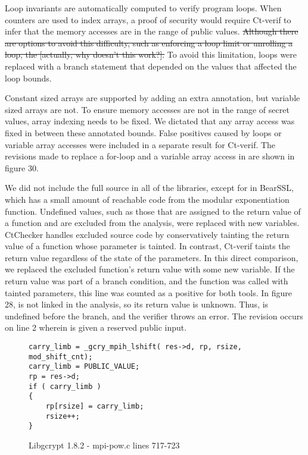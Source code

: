 Loop invariants are automatically computed to verify program loops.  When
counters are used to index arrays, a proof of security would require Ct-verif
to infer that the memory accesses are in the range of public values.  \sout{Although
there are options to avoid this difficulty, such as enforcing a loop limit or
unrolling a loop, the [actually, why doesn't this work?].}  To avoid this
limitation, loops were replaced with a branch statement that depended on the
values that affected the loop bounds.

Constant sized arrays are supported by adding an extra annotation, but variable
sized arrays are not. To ensure memory accesses are not in the range of secret
values, array indexing needs to be fixed.  We dictated that any array access
was fixed in between these annotated bounds.  False positives caused by loops
or variable array accesses were included in a separate result for Ct-verif. The
revisions made to replace a for-loop and a variable array access in 
are shown in figure 30.

We did not include the full source in all of the libraries, except for in BearSSL,
which has a small amount of reachable code from the modular exponentiation function.
Undefined values, such as those that are assigned to the return value of a function
and are excluded from the analysis, were replaced with new variables.  CtChecker handles
excluded source code by conservatively tainting the return value of a function
whose parameter is tainted.  In contrast, Ct-verif taints the return value
regardless of the state of the parameters.  In this direct comparison, we replaced
the excluded function's return value with some new variable.  If the return value
was part of a branch condition, and the function was called with tainted
parameters, this line was counted as a positive for both tools.
In figure 28,  is not linked in the analysis, so its
return value is unknown.  Thus,  is undefined before the
branch, and the verifier throws an error.  The revision occurs on line 2 wherein
 is given a reserved public input.

\begin{figure}[h!]
\begin{lstlisting}
carry_limb = _gcry_mpih_lshift( res->d, rp, rsize, mod_shift_cnt);
carry_limb = PUBLIC_VALUE;
rp = res->d;
if ( carry_limb )
{
    rp[rsize] = carry_limb;
    rsize++;
}
\end{lstlisting}
\caption{Libgcrypt 1.8.2 - mpi-pow.c lines 717-723}
\label{code:libgcrypt_normalize}
\end{figure}

